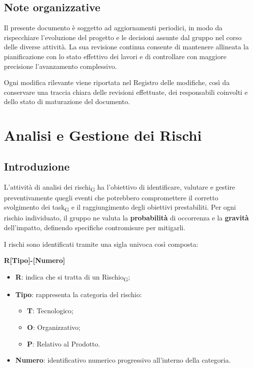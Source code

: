 \documentclass[a4paper, 10pt, colorlinks=true, linkcolor=black, urlcolor=blue, citecolor=blue, hidelinks]{article}
\begin{document}
\subsection{Note organizzative}

Il presente documento è soggetto ad aggiornamenti periodici, in modo da rispecchiare l'evoluzione del progetto e le decisioni assunte dal gruppo nel corso delle diverse attività. La sua revisione continua consente di mantenere allineata la pianificazione con lo stato effettivo dei lavori e di controllare con maggiore precisione l'avanzamento complessivo.

Ogni modifica rilevante viene riportata nel Registro delle modifiche, così da conservare una traccia chiara delle revisioni effettuate, dei responsabili coinvolti e dello stato di maturazione del documento.

\newpage

\section{Analisi e Gestione dei Rischi}
\label{tab:gestione-rischi}

\subsection{Introduzione}

L'attività di analisi dei rischi\textsubscript{G} ha l'obiettivo di identificare, valutare e gestire preventivamente quegli eventi che potrebbero compromettere il corretto svolgimento dei task\textsubscript{G} e il raggiungimento degli obiettivi prestabiliti. 
Per ogni rischio individuato, il gruppo ne valuta la \textbf{probabilità} di occorrenza e la \textbf{gravità} dell'impatto, definendo specifiche contromisure per mitigarli.

I rischi sono identificati tramite una sigla univoca così composta: \\
\centerline{\textbf{R[Tipo]-[Numero]}}
\begin{itemize}
    \item \textbf{R}: indica che si tratta di un Rischio\textsubscript{G};
    \item \textbf{Tipo}: rappresenta la categoria del rischio:
    \begin{itemize}
        \item \textbf{T}: Tecnologico;
        \item \textbf{O}: Organizzativo;
        \item \textbf{P}: Relativo al Prodotto.
    \end{itemize}
    \item \textbf{Numero}: identificativo numerico progressivo all'interno della categoria.
\end{itemize}
\end{document}
